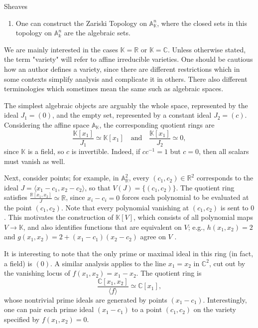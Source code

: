 \begin{section}{Sheaves}
\begin{definition}
\begin{enumerate}
   \item One can construct the Zariski Topology on \(\mathbb{A}^n_\mathbb{K}\), where the closed sets in this topology on \( \mathbb{A}^n_k \) are the algebraic sets.
\end{enumerate}
\end{definition}
\begin{remark}
We are mainly interested in the cases \( \mathbb{K} = \mathbb{R} \) or \( \mathbb{K} = \mathbb{C}\).
Unless otherwise stated, the term "variety" will refer to affine irreducible varieties. One should be cautious how an author defines a variety, since there are different
restrictions which in some contexts simplify analysis and complicate it in others. There also different terminologies which sometimes mean the same such as 
algebraic spaces.
\end{remark}

\begin{example}
The simplest algebraic objects are arguably the whole space, represented by the ideal \(J_1 = (0)\), and the empty set, represented by a constant ideal \(J_2 = (c)\). 
Considering the affine space \(\mathbb{A}_\mathbb{K}\), the corresponding quotient rings are 
\[
\frac{\mathbb{K}[x_1]}{J_1} \simeq \mathbb{K}[x_1] \quad \text{and} \quad \frac{\mathbb{K}[x_1]}{J_2} \simeq 0,
\]
since \(\mathbb{K}\) is a field, so \( c \) is invertible. Indeed, if \(c c^{-1} = 1\) but \(c = 0\), then all scalars must vanish as well.

Next, consider points; for example, in \(\mathbb{A}^2_\mathbb{R}\), every \((c_1, c_2)\in \mathbb{R}^2\) corresponds to the ideal \(J = \langle x_1 - c_1, x_2 - c_2 \rangle\), 
so that \(V(J) = \{ (c_1, c_2) \}\). The quotient ring satisfies \(\frac{\mathbb{R}[x_1, x_2]}{J} \simeq \mathbb{R}\), since \(x_i - c_i = 0\) forces each polynomial 
to be evaluated at the point \((c_1, c_2)\). Note that every polynomial vanishing at \((c_1, c_2)\) is sent to \( 0 \). 
This motivates the construction of \(\mathbb{K}[V]\), which consists of all polynomial maps \(V \to \mathbb{K}\), and also identifies functions that are equivalent on \( V \); 
e.g., \(h(x_1, x_2) = 2\) and \(g(x_1, x_2) = 2 + (x_1 - c_1)(x_2 - c_2)\) agree on \( V \) .

It is interesting to note that the only prime or maximal ideal in this ring (in fact, a field) is \((0)\). A similar analysis applies to the line \(x_1 = x_2\) in \(\mathbb{C}^2\), 
cut out by the vanishing locus of \(f(x_1, x_2) = x_1 - x_2\). The quotient ring is 
\[
\frac{\mathbb{C}[x_1, x_2]}{\langle f \rangle} \simeq \mathbb{C}[x_1],
\]
whose nontrivial prime ideals are generated by points \((x_1 - c_1)\). Interestingly, one can pair each prime ideal \( (x_1 - c_1) \) to a point \( (c_1, c_2) \) on the variety 
specified by \(f(x_1, x_2) = 0\).
\end{example}


\end{section}
